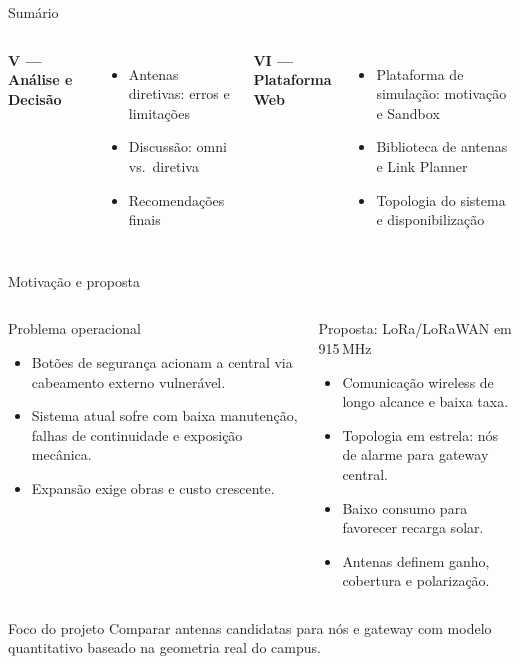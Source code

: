\documentclass[aspectratio=169]{beamer}
\newcommand{\SI}[2]{#1\,#2}
\begin{document}
\begin{frame}{Sumário}
\begin{columns}[T,onlytextwidth]
\vspace{0.5em}
\small\textbf{\color{UnBGreen} V — Análise e Decisão}
\scriptsize
\begin{itemize}
  \item Antenas diretivas: erros e limitações
  \item Discussão: omni vs.\ diretiva
  \item Recomendações finais
\end{itemize}

\vspace{0.5em}
\small\textbf{\color{UnBGreen} VI — Plataforma Web}
\scriptsize
\begin{itemize}
  \item Plataforma de simulação: motivação e Sandbox
  \item Biblioteca de antenas e Link Planner
  \item Topologia do sistema e disponibilização
\end{itemize}

\end{columns}
\end{frame}

\begin{frame}{Motivação e proposta}
\vspace{-1em}
\small
\begin{columns}[T,onlytextwidth]
\begin{block}{Problema operacional}
\begin{itemize}
  \item Botões de segurança acionam a central via cabeamento externo vulnerável.
  \item Sistema atual sofre com baixa manutenção, falhas de continuidade e exposição mecânica.
  \item Expansão exige obras e custo crescente.
\end{itemize}
\end{block}
\begin{block}{Proposta: LoRa/LoRaWAN em \SI{915}{MHz}}
\begin{itemize}
  \item Comunicação wireless de longo alcance e baixa taxa.
  \item Topologia em estrela: nós de alarme para gateway central.
  \item Baixo consumo para favorecer recarga solar.
  \item Antenas definem ganho, cobertura e polarização.
\end{itemize}
\end{block}
\end{columns}
\vspace{0.4em}
\begin{block}{Foco do projeto}
Comparar antenas candidatas para nós e gateway com modelo quantitativo baseado na geometria real do campus.
\end{block}
\end{frame}
\end{document}
